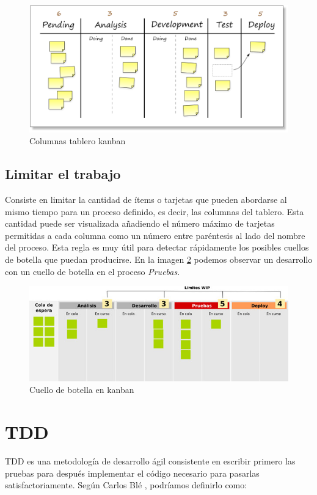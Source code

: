 	\begin{figure}[H]
	\centering
	\includegraphics[scale=1, fbox={\fboxrule} 4mm]{images/04-metodo/03-kanban_table_2.png}
	\caption{Columnas tablero kanban}
	\label{fig:kanban_table_2}
	\end{figure}
	
	\subsection{Limitar el trabajo}
	Consiste en limitar la cantidad de ítems o tarjetas que pueden abordarse al mismo tiempo para un proceso definido, es decir, las columnas del tablero. Esta cantidad puede ser visualizada añadiendo el número máximo de tarjetas permitidas a cada columna como un número entre paréntesis al lado del nombre del proceso.
	Esta regla es muy útil para detectar rápidamente los posibles cuellos de botella que puedan producirse. En la imagen \ref{fig:kanban_table_3} podemos observar un desarrollo con un cuello de botella en el proceso \textit{Pruebas}.
	
	\begin{figure}[H]
	\centering
	\includegraphics[scale=1, fbox={\fboxrule} 4mm]{images/04-metodo/04-kanban_table_3.jpg}
	\caption{Cuello de botella en kanban}
	\label{fig:kanban_table_3}
	\end{figure}

\section{\acs{TDD}}
	\acf{TDD} es una metodología de desarrollo ágil consistente en escribir primero las pruebas para después implementar el código necesario para pasarlas satisfactoriamente. Según Carlos Blé \cite{Ble10}, podríamos definirlo como:
	
